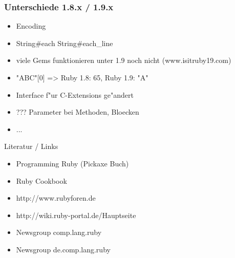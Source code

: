 \documentclass{beamer}
\begin{document}
\begin{frame}
 \frametitle{Unterschiede 1.8.x / 1.9.x}
 \begin{itemize}
   \item<1->Encoding
   \item<2->String#each \arrow String#each_line
   \item<3->viele Gems funktionieren unter 1.9 noch nicht (www.isitruby19.com)
   \item<4->"ABC"[0] => Ruby 1.8: 65, Ruby 1.9: "A"
   \item<5->Interface f"ur C-Extensions ge"andert
   \item<6->??? Parameter bei Methoden, Bloecken
   \item ... 
 \end{itemize}

\end{frame}

\begin{frame}
  Literatur / Links
  \begin{itemize}
    \item Programming Ruby (Pickaxe Buch) 
    \item Ruby Cookbook
    \item http://www.rubyforen.de
    \item http://wiki.ruby-portal.de/Hauptseite
    \item Newsgroup comp.lang.ruby 
    \item Newsgroup de.comp.lang.ruby 
  \end{itemize}
\end{frame}
\end{document}
